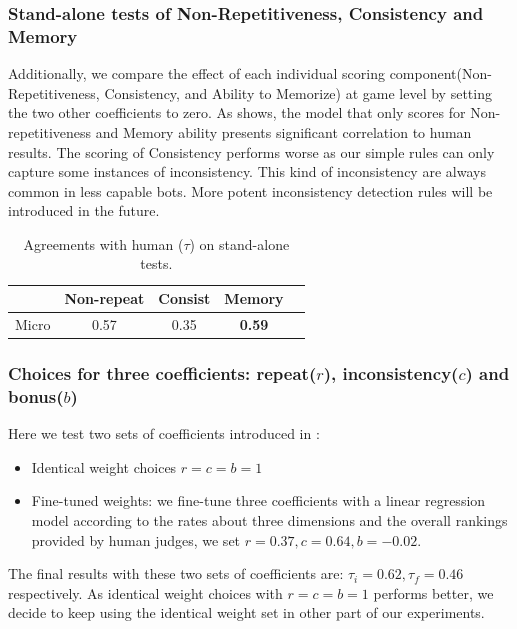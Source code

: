 \subsubsection*{Stand-alone tests of Non-Repetitiveness, 
Consistency and Memory}
Additionally, we compare the effect of each individual 
scoring component(Non-Repetitiveness, Consistency, 
and Ability to Memorize) 
at game level by setting the two other coefficients to zero. 
As  shows, the model that only scores for 
Non-repetitiveness and Memory ability presents significant 
correlation to human results. The scoring of Consistency 
performs worse as our simple rules can only capture some instances
of inconsistency. This kind of inconsistency are always common 
in less capable bots. More potent inconsistency 
detection rules will be introduced in the future.

\begin{table}
\small
\centering
\begin{tabular}{lcccc}
\toprule
& Non-repeat & Consist & Memory \\ \midrule
Micro & 0.57  & 0.35    & \textbf{0.59} \\ \bottomrule
\end{tabular}
\caption{Agreements with human ($\tau$) on stand-alone tests.}
\label{tab:coef}
\end{table}

\subsubsection*{Choices for three coefficients: 
repeat($r$), inconsistency($c$) and bonus($b$)}

Here we test two sets of coefficients introduced in : 
\begin{itemize}
\item Identical weight choices $r = c = b = 1$
\item Fine-tuned weights: we fine-tune three coefficients with a linear regression model according to the rates about three dimensions and the overall rankings provided by human judges, we set $r = 0.37, c = 0.64, b = -0.02$.
\end{itemize}

 The final results with these two sets of coefficients are: $\tau_i = 0.62, \tau_f = 0.46 $ respectively. As identical weight choices with $r=c=b=1$ performs better, we decide to keep using the identical weight set in other part of our experiments.  
 

